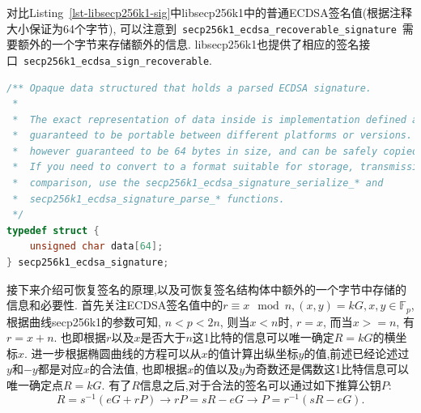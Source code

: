 \documentclass{article}
\newcommand{\F}{\mathbb{F}}
\newcommand{\code}[1]{\lstinline!#1!}
\begin{document}
对比Listing~\ref{lst-libsecp256k1-sig}中libsecp256k1中的普通ECDSA签名值(根据注释大小保证为64个字节),
可以注意到~\code{secp256k1_ecdsa_recoverable_signature}~需要额外的一个字节来存储额外的信息.
libsecp256k1也提供了相应的签名接口~\code{secp256k1_ecdsa_sign_recoverable}.

\begin{lstlisting}[language=c, caption = libsecp256k1中的\textsf{secp256k1_ecdsa_signature}, label=lst-libsecp256k1-sig]
/** Opaque data structured that holds a parsed ECDSA signature.
 *
 *  The exact representation of data inside is implementation defined and not
 *  guaranteed to be portable between different platforms or versions. It is
 *  however guaranteed to be 64 bytes in size, and can be safely copied/moved.
 *  If you need to convert to a format suitable for storage, transmission, or
 *  comparison, use the secp256k1_ecdsa_signature_serialize_* and
 *  secp256k1_ecdsa_signature_parse_* functions.
 */
typedef struct {
    unsigned char data[64];
} secp256k1_ecdsa_signature;
\end{lstlisting}

接下来介绍可恢复签名的原理,以及可恢复签名结构体中额外的一个字节中存储的信息和必要性.
首先关注ECDSA签名值中的$r \equiv x \mod n, (x, y) = kG, x, y \in \F_p$, 根据曲线secp256k1的参数可知,
$n < p < 2n$, 则当$x < n$时, $r = x$, 而当$x >= n$, 有$r = x + n$. 
也即根据$r$以及$x$是否大于$n$这1比特的信息可以唯一确定$R = kG$的横坐标$x$.
进一步根据椭圆曲线的方程可以从$x$的值计算出纵坐标$y$的值,前述已经论述过$y$和$-y$都是对应$x$的合法值,
也即根据$x$的值以及$y$为奇数还是偶数这1比特信息可以唯一确定点$R = kG$.
有了$R$信息之后,对于合法的签名可以通过如下推算公钥$P$:
$$
R = s^{-1}(eG+rP) \rightarrow rP = sR - eG \rightarrow P = r^{-1}(sR-eG).
$$
\end{document}
